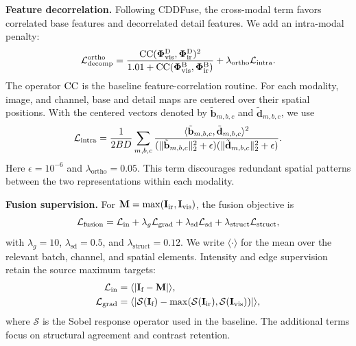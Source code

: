 \textbf{Feature decorrelation.}
Following CDDFuse, the cross-modal term favors correlated base features and decorrelated detail features. We add an intra-modal penalty:
\begin{equation}
 \mathcal{L}_{\text{decomp}}^{\text{ortho}}=\frac{\operatorname{CC}(\bm{\Phi}^{\text{D}}_{\mathrm{vis}},\bm{\Phi}^{\text{D}}_{\mathrm{ir}})^2}
 {1.01+\operatorname{CC}(\bm{\Phi}^{\text{B}}_{\mathrm{vis}},\bm{\Phi}^{\text{B}}_{\mathrm{ir}})}
 +\lambda_{\mathrm{ortho}}\mathcal{L}_{\text{intra}}.
\end{equation}
The operator $\operatorname{CC}$ is the baseline feature-correlation routine. For each modality, image, and channel, base and detail maps are centered over their spatial positions. With the centered vectors denoted by $\tilde{\mathbf b}_{m,b,c}$ and $\tilde{\mathbf d}_{m,b,c}$, we use
\begin{equation}
 \mathcal{L}_{\text{intra}}=\frac{1}{2BD}\sum_{m,b,c}
 \frac{\langle\tilde{\mathbf b}_{m,b,c},\tilde{\mathbf d}_{m,b,c}\rangle^2}
 {(\|\tilde{\mathbf b}_{m,b,c}\|_2^2+\epsilon)
  (\|\tilde{\mathbf d}_{m,b,c}\|_2^2+\epsilon)}.
\end{equation}
Here $\epsilon=10^{-6}$ and $\lambda_{\mathrm{ortho}}=0.05$. This term discourages redundant spatial patterns between the two representations within each modality.

\textbf{Fusion supervision.}
For $\mathbf M=\max(\mathbf{I}_{\text{ir}},\mathbf{I}_{\text{vis}})$, the fusion objective is
\begin{equation}
 \mathcal{L}_{\text{fusion}}=\mathcal{L}_{\text{in}}+\lambda_g\mathcal{L}_{\text{grad}}+
           \lambda_{\mathrm{sd}}\mathcal{L}_{\text{sd}}+\lambda_{\mathrm{struct}}\mathcal{L}_{\text{struct}},
 \label{eq:fusion_loss}
\end{equation}
with $\lambda_g=10$, $\lambda_{\mathrm{sd}}=0.5$, and $\lambda_{\mathrm{struct}}=0.12$. We write $\langle\cdot\rangle$ for the mean over the relevant batch, channel, and spatial elements. Intensity and edge supervision retain the source maximum targets:
\begin{equation}
\begin{aligned}
 \mathcal{L}_{\text{in}}&=\langle|\mathbf{I}_{\text{f}}-\mathbf M|\rangle,\\
 \mathcal{L}_{\text{grad}}&=\langle|\mathcal S(\mathbf{I}_{\text{f}})-
                \max(\mathcal S(\mathbf{I}_{\text{ir}}),\mathcal S(\mathbf{I}_{\text{vis}}))|\rangle,
\end{aligned}
\end{equation}
where $\mathcal S$ is the Sobel response operator used in the baseline. The additional terms focus on structural agreement and contrast retention.

